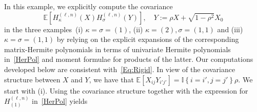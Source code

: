 \documentclass[AHL,Unicode,longabstracts,published]{cedram}
\newcommand{\E}[1]{\mathbb{E}\left[#1\right]}
\newcommand{\ind}[1]{\mathbb{I}
\left\{#1\right\}}
\begin{document}
\begin{exam}\label{Ex:Rigid}
In this example, we explicitly compute the covariance
\[
\E{H_{\kappa}^{(\ell,n)}(X)H_{\sigma}^{(\ell,n)}(Y)}, \quad Y:=\rho X+\sqrt{1-\rho^2}X_0
\]
in the three examples~(i) $\kappa=\sigma=(1)$, (ii) $\kappa=(2),\sigma=(1,1)$ and (iii) $\kappa=\sigma=(1,1)$ by relying on the explicit expansions of the corresponding matrix-Hermite polynomials in terms of univariate Hermite polynomials in~\eqref{HerPol} and moment formulae for products of the latter. Our computations developed below are consistent with~\eqref{Eq:Rigid}. In view of the covariance structure between $X$ and $Y$, we have that $\E{X_{ij}Y_{i'j'}} = \ind{i=i',j=j'} \rho$. We start with (i). Using the covariance structure together with the expression for $H_{(1)}^{(\ell,n)}$ in~\eqref{HerPol} yields


\end{exam}
\end{document}

